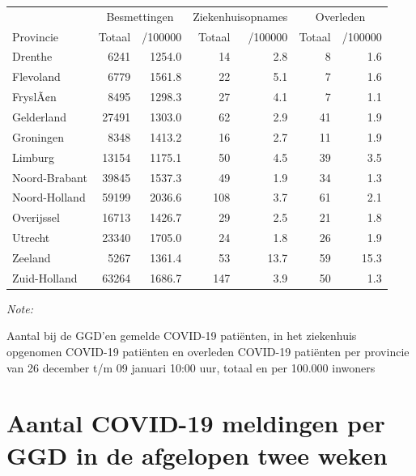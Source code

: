 \documentclass[
  english,
  man,floatsintext]{apa6}
\begin{document}
\begin{table}
\centering
\begin{threeparttable}
\begin{tabular}{lrrrrrr}
\toprule
\multicolumn{1}{c}{ } & \multicolumn{2}{c}{Besmettingen} & \multicolumn{2}{c}{Ziekenhuisopnames} & \multicolumn{2}{c}{Overleden} \\
\cmidrule(l{3pt}r{3pt}){2-3} \cmidrule(l{3pt}r{3pt}){4-5} \cmidrule(l{3pt}r{3pt}){6-7}
Provincie & Totaal & /100000 & Totaal & /100000 & Totaal & /100000\\
\midrule
Drenthe & 6241 & 1254.0 & 14 & 2.8 & 8 & 1.6\\
Flevoland & 6779 & 1561.8 & 22 & 5.1 & 7 & 1.6\\
FryslÃ¢n & 8495 & 1298.3 & 27 & 4.1 & 7 & 1.1\\
Gelderland & 27491 & 1303.0 & 62 & 2.9 & 41 & 1.9\\
Groningen & 8348 & 1413.2 & 16 & 2.7 & 11 & 1.9\\
Limburg & 13154 & 1175.1 & 50 & 4.5 & 39 & 3.5\\
Noord-Brabant & 39845 & 1537.3 & 49 & 1.9 & 34 & 1.3\\
Noord-Holland & 59199 & 2036.6 & 108 & 3.7 & 61 & 2.1\\
Overijssel & 16713 & 1426.7 & 29 & 2.5 & 21 & 1.8\\
Utrecht & 23340 & 1705.0 & 24 & 1.8 & 26 & 1.9\\
Zeeland & 5267 & 1361.4 & 53 & 13.7 & 59 & 15.3\\
Zuid-Holland & 63264 & 1686.7 & 147 & 3.9 & 50 & 1.3\\
\bottomrule
\end{tabular}
\begin{tablenotes}
\item \textit{Note: } 
\item Aantal bij de GGD’en gemelde COVID-19 patiënten, in het ziekenhuis opgenomen COVID-19 patiënten en overleden COVID-19 patiënten per provincie van 26 december t/m 09 januari 10:00 uur, totaal en per 100.000 inwoners
\end{tablenotes}
\end{threeparttable}
\end{table}

\newpage

\hypertarget{aantal-covid-19-meldingen-per-ggd-in-de-afgelopen-twee-weken}{%
\section{Aantal COVID-19 meldingen per GGD in de afgelopen twee weken}\label{aantal-covid-19-meldingen-per-ggd-in-de-afgelopen-twee-weken}}
\end{document}
